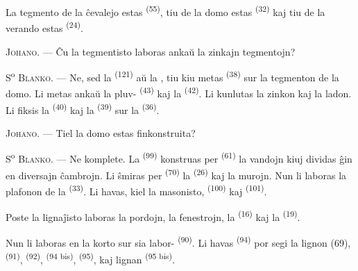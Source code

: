 
La tegmento de la ĉevalejo estas  \textsuperscript{(55)},
tiu de la domo estas  \textsuperscript{(32)} kaj tiu de la
verando estas  \textsuperscript{(24)}.

\textsc{Johano}. --- Ĉu la tegmentisto laboras ankaŭ la zinkajn tegmentojn?

S\textsuperscript{o} \textsc{Blanko}. --- Ne, sed la 
\textsuperscript{(121)} aŭ la , tiu kiu metas
 \textsuperscript{(38)} sur la tegmenton de la domo. Li metas
ankaŭ la pluv- \textsuperscript{(43)} kaj la
 \textsuperscript{(42)}. Li kunlutas la zinkon kaj la
ladon. Li fiksis la  \textsuperscript{(40)} kaj la
 \textsuperscript{(39)} sur la 
\textsuperscript{(36)}.

\textsc{Johano}. --- Tiel la domo estas finkonstruita?

\VUsaut{3.0mm}
\VUsaut{3.0mm}

S\textsuperscript{o} \textsc{Blanko}. --- Ne komplete. La 
\textsuperscript{(99)} konstruas per  \textsuperscript{(61)} la
vandojn kiuj dividas ĝin en diversajn ĉambrojn. Li ŝmiras per 
\textsuperscript{(70)} la  \textsuperscript{(26)} kaj la
murojn. Nun li laboras la plafonon de la 
\textsuperscript{(33)}. Li havas, kiel la masonisto, 
\textsuperscript{(100)} kaj  \textsuperscript{(101)}.

Poste la lignaĵisto laboras la pordojn, la fenestrojn, la 
\textsuperscript{(16)} kaj la  \textsuperscript{(19)}.

Nun li laboras en la korto sur sia labor- \textsuperscript{(90)}.
Li havas  \textsuperscript{(94)} por segi la lignon (69),
 \textsuperscript{(91)}, 
\textsuperscript{(92)},  \textsuperscript{(94 bis)},
 \textsuperscript{(95)}, kaj lignan 
\textsuperscript{(95 bis)}.

